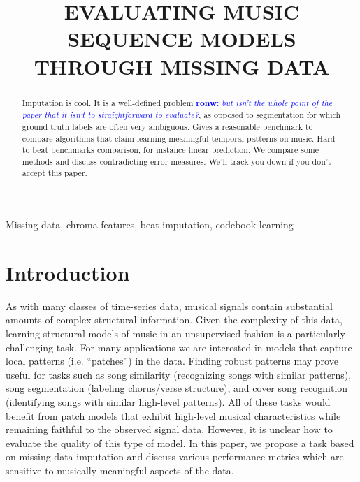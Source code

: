 \documentclass{article}
\title{EVALUATING MUSIC SEQUENCE MODELS THROUGH MISSING DATA}
\newcommand{\FIXME}[2][FIXME]{\textcolor{blue}{\textbf{#1}: \emph{#2}}}
\begin{document}
\ninept
%
\maketitle
%
\begin{abstract}
Imputation is cool. It is a well-defined problem
\FIXME[ronw]{but isn't the whole point of the paper
that it isn't to straightforward to evaluate?},
as opposed to segmentation for which ground truth labels are often
very ambiguous.
%
Gives a reasonable benchmark to compare algorithms that claim learning meaningful
temporal patterns on music. Hard to beat benchmarks comparison, for instance linear
prediction. We compare some methods and discuss contradicting error measures. 
We'll track you down if you don't accept this paper.
\end{abstract}
%
\begin{keywords}
Missing data, chroma features, beat imputation, codebook learning
\end{keywords}
%


\section{Introduction}
\label{sec:intro}
As with many classes of time-series data, musical signals contain
substantial amounts of complex structural information.  Given the
complexity of this data, learning structural models of music in an
unsupervised fashion is a particularly challenging task.  For many
applications we are interested in models that capture local patterns
(i.e. ``patches'') in the data.  Finding robust patterns may prove
useful for tasks such as song similarity (recognizing songs with
similar patterns), song segmentation (labeling chorus/verse
structure), and cover song recognition (identifying songs with similar
high-level patterns).  All of these tasks would benefit from patch
models that exhibit high-level musical characteristics while remaining
faithful to the observed signal data.
However, it is unclear how to evaluate the quality of this type of
model.  In this paper, we propose a task based on missing data
imputation and discuss various performance metrics which are sensitive
to musically meaningful aspects of the data.
\end{document}
